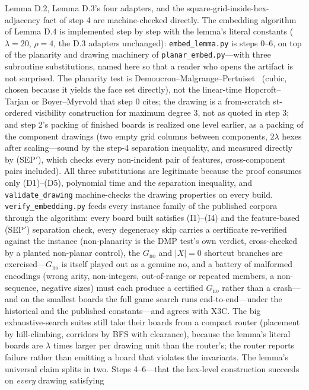 \documentclass[11pt,a4paper]{article}
\theoremstyle{plain}
\theoremstyle{definition}
\theoremstyle{plain}
\theoremstyle{definition}
\theoremstyle{remark}
\newcommand{\src}[1]{\texttt{#1}}
\begin{document}
Lemma D.2, Lemma D.3's four adapters, and the square-grid-inside-hex-adjacency fact of step 4 are
machine-checked directly. The embedding algorithm of Lemma D.4 is implemented step by step with
the lemma's literal constants ($\lambda=20$, $\rho=4$, the D.3 adapters unchanged):
\src{embed\_lemma.py} is steps 0--6, on top of the planarity and drawing machinery of
\src{planar\_embed.py}---with three subroutine substitutions, named here so that a reader who
opens the artifact is not surprised. The planarity test is Demoucron--Malgrange--Pertuiset~\cite{DMP64} (cubic,
chosen because it yields the face set directly), not the linear-time Hopcroft--Tarjan or
Boyer--Myrvold that step 0 cites; the drawing is a from-scratch st-ordered visibility
construction for maximum degree 3, not \cite{TT89} as quoted in step 3; and step 2's packing of
finished boards is realized one level earlier, as a packing of the component drawings (two empty
grid columns between components, $2\lambda$ hexes after scaling---sound by the step-4 separation
inequality, and measured directly by (SEP$'$), which checks every non-incident pair of features,
cross-component pairs included). All three substitutions are
legitimate because the proof consumes only (D1)--(D5), polynomial time and the separation
inequality, and \src{validate\_drawing} machine-checks the drawing properties on every build.
\src{verify\_embedding.py} feeds every instance family of the published corpora through the
algorithm: every board built satisfies (I1)--(I4) and the feature-based (SEP$'$) separation
check, every
degeneracy skip carries a certificate re-verified against the instance (non-planarity is the DMP
test's own verdict, cross-checked by a planted non-planar control), the $G_{\mathrm{no}}$ and
$|X|=0$ shortcut branches are exercised---$G_{\mathrm{no}}$ is itself played out as a genuine
no, and a battery of malformed encodings (wrong arity, non-integers, out-of-range or repeated
members, a non-sequence, negative sizes) must each produce a certified $G_{\mathrm{no}}$ rather
than a crash---and on the smallest boards
the full game search runs end-to-end---under the historical and the published constants---and
agrees with \textsc{X3C}. The big
exhaustive-search suites still take their boards from a compact router (placement by
hill-climbing, corridors by BFS with clearance), because the lemma's literal boards are $\lambda$
times larger per drawing unit than the router's; the router reports failure rather than emitting
a board that violates the invariants. The lemma's universal claim splits in two. Steps
4--6---that the hex-level construction succeeds on \emph{every} drawing satisfying
\end{document}
